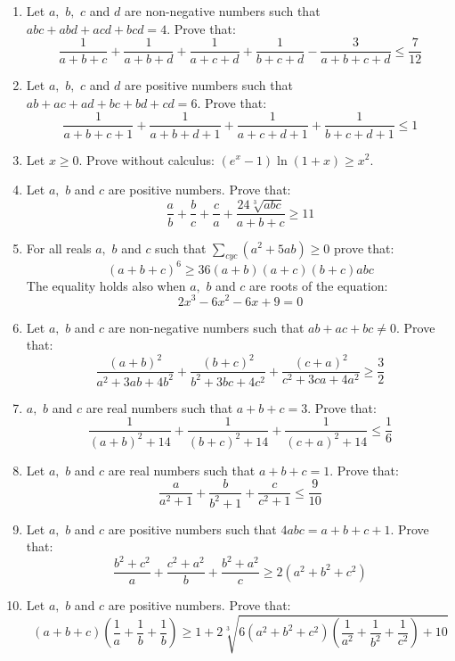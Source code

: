 \documentclass{article}
\begin{document}
\begin{enumerate}
\item  Let $a,$ $b,$ $c$ and $d$ are non-negative numbers such that $abc+abd+acd+bcd=4.$ Prove that:
\[\frac {1}{a+b+c}+\frac {1}{a+b+d}+\frac {1}{a+c+d}+\frac {1}{b+c+d}-\frac {3}{a+b+c+d}\leq\frac {7}{12}\]

\item  Let $a,$ $b,$ $c$ and $d$ are positive numbers such that $ab+ac+ad+bc+bd+cd=6.$ Prove that:
\[\frac {1}{a+b+c+1}+\frac {1}{a+b+d+1}+\frac {1}{a+c+d+1}+\frac {1}{b+c+d+1}\leq1\]

\item  Let $x\geq0.$ Prove without calculus: $\displaystyle (e^x-1)\ln(1+x)\geq x^2.$\\

\item  Let $a,$ $b$ and $c$ are positive numbers. Prove that:
\[\frac {a}{b}+\frac {b}{c}+\frac {c}{a}+\frac {24\sqrt[3]{abc}}{a+b+c} \geq 11\]

\item  For all  reals  $ a,$ $ b$ and $ c$ such that $\displaystyle \sum_{cyc}(a^2 + 5ab)\geq0$ prove that:
\[ (a + b + c)^6\geq36(a + b)(a + c)(b + c)abc\]
The equality holds also when $ a,$ $ b$ and $ c$ are roots of the equation: 
\[ 2x^3-6x^2-6x+9=0\]

\item  Let $ a,$ $ b$ and $ c$ are non-negative numbers such that $ ab+ac+bc\neq0.$ Prove that:
\[ \frac {(a+b)^2}{a^2+3ab+4b^2}+\frac {(b+c)^2}{b^2+3bc+4c^2}+\frac {(c+a)^2}{c^2+3ca+4a^2}\geq\frac {3}{2}\]

\item  $ a,$ $ b$ and $ c$ are real numbers such that $ a+b+c=3.$ Prove that:
\[ \frac 1{(a+b)^2+14}+\frac 1{(b+c)^2+14}+\frac 1{(c+a)^2+14}\leq\frac {1}{6}\]

\item  Let $ a,$ $ b$ and $ c$ are  real  numbers such that $ a+b+c=1.$ Prove that:
\[ \frac  {a}{a^2 + 1} + \frac  {b}{b^2 + 1} + \frac  {c}{c^2 + 1}\leq\frac  {9}{10}\]

\item  Let $ a,$ $ b$ and $ c$ are positive numbers such that $ 4abc = a + b + c + 1.$ Prove that:
\[ \frac  {b^2 + c^2}{a} + \frac  {c^2 + a^2}{b} + \frac  {b^2 + a^2}{c}\geq 2(a^2 + b^2 + c^2)\]

\item  Let $ a,$ $ b$ and $ c$ are positive numbers. Prove that:
\[ (a + b + c)\left(\frac  {1}{a} + \frac  {1}{b} + \frac  {1}{b}\right)\geq1 + 2 \sqrt [3] {6(a^2 + b^2 + c^2)\left(\frac  {1}{a^2} + \frac  {1}{b^2} + \frac  {1}{c^2}\right) + 10}\]


\end{enumerate}
\end{document}
